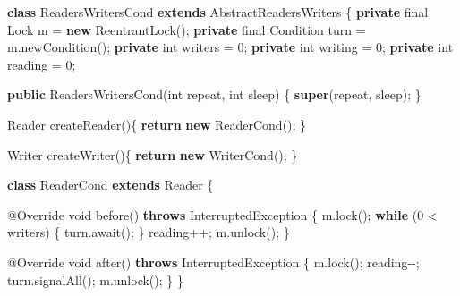 \documentclass[
]{article}
\newenvironment{Shaded}{\begin{snugshade}}{\end{snugshade}}
\newcommand{\AttributeTok}[1]{\textcolor[rgb]{0.77,0.63,0.00}{#1}}
\newcommand{\BuiltInTok}[1]{#1}
\newcommand{\DataTypeTok}[1]{\textcolor[rgb]{0.13,0.29,0.53}{#1}}
\newcommand{\DecValTok}[1]{\textcolor[rgb]{0.00,0.00,0.81}{#1}}
\newcommand{\FunctionTok}[1]{\textcolor[rgb]{0.00,0.00,0.00}{#1}}
\newcommand{\KeywordTok}[1]{\textcolor[rgb]{0.13,0.29,0.53}{\textbf{#1}}}
\newcommand{\NormalTok}[1]{#1}
\begin{document}
\begin{Shaded}
\begin{Highlighting}[]
\KeywordTok{class}\NormalTok{ ReadersWritersCond }\KeywordTok{extends}\NormalTok{ AbstractReadersWriters}
\NormalTok{\{}
    \KeywordTok{private} \DataTypeTok{final} \BuiltInTok{Lock}\NormalTok{ m = }\KeywordTok{new} \BuiltInTok{ReentrantLock}\NormalTok{();}
    \KeywordTok{private} \DataTypeTok{final} \BuiltInTok{Condition}\NormalTok{ turn = m.}\FunctionTok{newCondition}\NormalTok{();}
    \KeywordTok{private} \DataTypeTok{int}\NormalTok{ writers = }\DecValTok{0}\NormalTok{;}
    \KeywordTok{private} \DataTypeTok{int}\NormalTok{ writing = }\DecValTok{0}\NormalTok{;}
    \KeywordTok{private} \DataTypeTok{int}\NormalTok{ reading = }\DecValTok{0}\NormalTok{;}

    \KeywordTok{public} \FunctionTok{ReadersWritersCond}\NormalTok{(}\DataTypeTok{int}\NormalTok{ repeat, }\DataTypeTok{int}\NormalTok{ sleep) \{}
        \KeywordTok{super}\NormalTok{(repeat, sleep);}
\NormalTok{    \}}

    \BuiltInTok{Reader} \FunctionTok{createReader}\NormalTok{()\{}
        \KeywordTok{return} \KeywordTok{new} \FunctionTok{ReaderCond}\NormalTok{();}
\NormalTok{    \}}

    \BuiltInTok{Writer} \FunctionTok{createWriter}\NormalTok{()\{}
        \KeywordTok{return} \KeywordTok{new} \FunctionTok{WriterCond}\NormalTok{();}
\NormalTok{    \}}

    \KeywordTok{class}\NormalTok{ ReaderCond }\KeywordTok{extends} \BuiltInTok{Reader}\NormalTok{ \{}

        \AttributeTok{@Override}
        \DataTypeTok{void} \FunctionTok{before}\NormalTok{() }\KeywordTok{throws} \BuiltInTok{InterruptedException}\NormalTok{ \{}
\NormalTok{            m.}\FunctionTok{lock}\NormalTok{();}
            \KeywordTok{while}\NormalTok{ (}\DecValTok{0}\NormalTok{ \textless{} writers) \{}
\NormalTok{                turn.}\FunctionTok{await}\NormalTok{();}
\NormalTok{            \}}
\NormalTok{            reading++;}
\NormalTok{            m.}\FunctionTok{unlock}\NormalTok{();}
\NormalTok{        \}}

        \AttributeTok{@Override}
        \DataTypeTok{void} \FunctionTok{after}\NormalTok{() }\KeywordTok{throws} \BuiltInTok{InterruptedException}\NormalTok{ \{}
\NormalTok{            m.}\FunctionTok{lock}\NormalTok{();}
\NormalTok{            reading{-}{-};}
\NormalTok{            turn.}\FunctionTok{signalAll}\NormalTok{();}
\NormalTok{            m.}\FunctionTok{unlock}\NormalTok{();}
\NormalTok{        \}}
\NormalTok{    \}}


\end{Highlighting}
\end{Shaded}
\end{document}
